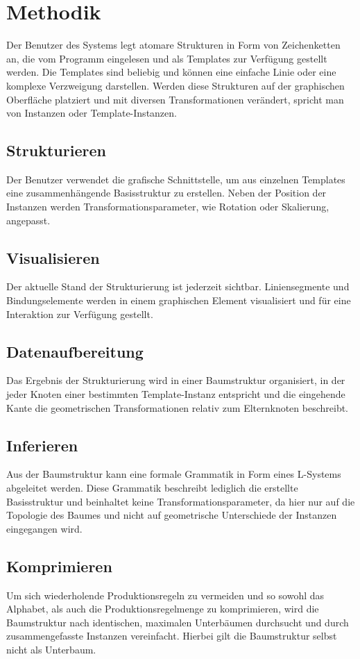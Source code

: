 \section{Methodik}
Der Benutzer des Systems legt atomare Strukturen in Form von Zeichenketten an, die vom Programm eingelesen und
als Templates zur Verfügung gestellt werden.
Die Templates sind beliebig und können eine einfache Linie oder eine komplexe Verzweigung darstellen.
Werden diese Strukturen auf der graphischen Oberfläche platziert und mit diversen Transformationen verändert, spricht man
von Instanzen oder Template-Instanzen.

\subsection*{Strukturieren}
Der Benutzer verwendet die grafische Schnittstelle, um aus einzelnen Templates eine zusammenhängende Basisstruktur zu
erstellen.
Neben der Position der Instanzen werden Transformationsparameter, wie Rotation oder Skalierung, angepasst.

\subsection*{Visualisieren}
Der aktuelle Stand der Strukturierung ist jederzeit sichtbar.
Liniensegmente und Bindungselemente werden in einem graphischen Element visualisiert und für eine Interaktion zur Verfügung
gestellt.

\subsection*{Datenaufbereitung}
Das Ergebnis der Strukturierung wird in einer Baumstruktur
organisiert, in der jeder Knoten einer bestimmten Template-Instanz entspricht und die eingehende Kante die
geometrischen Transformationen relativ zum Elternknoten beschreibt.

\subsection*{Inferieren}
Aus der Baumstruktur kann eine formale Grammatik in Form eines L-Systems abgeleitet werden.
Diese Grammatik beschreibt lediglich die erstellte Basisstruktur und beinhaltet keine Transformationsparameter, da hier
nur auf die Topologie des Baumes und nicht auf geometrische Unterschiede der Instanzen eingegangen wird.

\subsection*{Komprimieren}
Um sich wiederholende Produktionsregeln zu vermeiden und so sowohl das Alphabet, als auch die Produktionsregelmenge
zu komprimieren, wird die Baumstruktur nach identischen, maximalen Unterbäumen durchsucht und durch zusammengefasste
Instanzen vereinfacht.
Hierbei gilt die Baumstruktur selbst nicht als Unterbaum.

